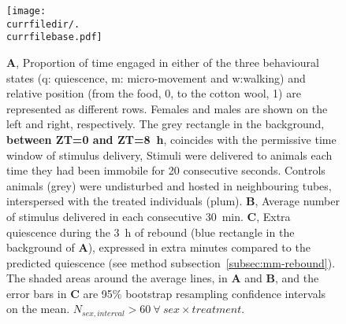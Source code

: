 \begin{figure}[h!]
	\centering   
	\texttt{[image: \\currfiledir/.\\currfilebase.pdf]}
	  \caption[Daytime sleep deprivation causes rebound when it finished before dusk]{
	\textbf{A}, Proportion of time engaged in either of the three behavioural states (q: quiescence, m: micro-movement and w:walking) and relative position (from the food, 0, to the cotton wool, 1) 
	are represented as different rows.
	Females and males are shown on the left and right, respectively.
	The grey rectangle in the background,
	\textbf{between ZT=0 and ZT=8~h}, %
	coincides with the permissive time window of stimulus delivery,
	Stimuli were delivered to animals each time they had been immobile for 20 consecutive seconds. %
	Controls animals (grey) were undisturbed and hosted in neighbouring tubes, interspersed with the treated individuals (plum).
	\textbf{B}, Average number of stimulus delivered in each consecutive 30~min.
	\textbf{C}, Extra quiescence during the 3~h of rebound (blue rectangle in the background of \textbf{A}), expressed in extra minutes compared to the predicted quiescence (see method subsection~\ref{subsec:mm-rebound}).
	The shaded areas around the average lines, in \textbf{A} and \textbf{B}, and the error bars in \textbf{C} are 95\% bootstrap resampling confidence intervals on the mean.
	$N_{sex,interval} > 60~\forall~sex \times treatment$.
\label{fig:\currfilebase}
}
\end{figure}
